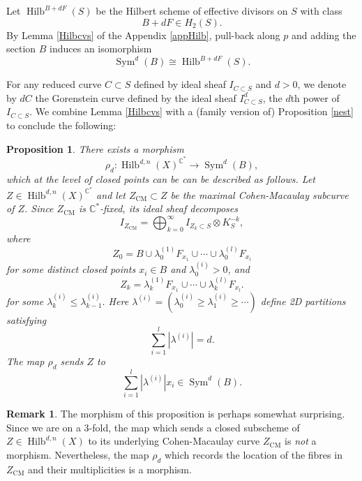 \documentclass{amsart}
\newtheorem{proposition}[theorem]{Proposition}
\theoremstyle{definition}
\newtheorem{remark}[theorem]{Remark}
\newcommand{\CC} {\mathbb{C}}          %
\newcommand{\Sym}{\operatorname{Sym}}
\newcommand{\Hilb}{\operatorname{Hilb}}
\newcommand{\CM}{\operatorname{CM}}
\begin{document}
Let $\Hilb^{B+dF}(S)$ be the Hilbert scheme of effective divisors on $S$ with class $$B+dF \in H_2(S).$$ By Lemma \ref{Hilbcvs} of the Appendix \ref{appHilb}, pull-back along $p$ and adding the section $B$ induces an isomorphism
$$
\Sym^d(B) \cong \Hilb^{B+dF}(S).
$$

For any reduced curve $C \subset S$ defined by ideal sheaf $I_{C \subset S}$ and $d >0$, we denote by $dC$ the Gorenstein curve defined by the ideal sheaf $I_{C \subset S}^d$, the $d$th power of $I_{C \subset S}$. We combine Lemma \ref{Hilbcvs} with a (family version of) Proposition \ref{nest} to conclude the following:
\begin{proposition} \label{proprho}
There exists a morphism
$$
\rho_d : \Hilb^{d,n}(X)^{\CC^*} \longrightarrow \Sym^d(B), 
$$
which at the level of closed points can be can be described as follows. Let $Z \in \Hilb^{d,n}(X)^{\CC^*}$ and let $Z_{\CM} \subset Z$ be the maximal Cohen-Macaulay subcurve of $Z$. Since $Z_{\CM}$ is $\CC^*$-fixed, its ideal sheaf decomposes
$$
I_{Z_{\CM}} = \bigoplus_{k=0}^{\infty} I_{Z_k \subset S} \otimes K_{S}^{-k},
$$
where 
$$
Z_0 = B \cup \lambda_{0}^{(1)} F_{x_1} \cup \cdots \cup \lambda_{0}^{(l)} F_{x_l}
$$
for some distinct closed points $x_i \in B$ and $\lambda_{0}^{(i)} > 0$, and
$$
Z_k = \lambda_{k}^{(1)} F_{x_1} \cup \cdots \cup \lambda_{k}^{(l)} F_{x_l}.
$$
for some $\lambda_{k}^{(i)} \leq \lambda_{k-1}^{(i)}$. Here $\lambda^{(i)} = (\lambda^{(i)}_{0} \geq \lambda^{(i)}_{1} \geq \cdots)$ define 2D partitions satisfying 
$$
\sum_{i=1}^{l} |\lambda^{(i)}| = d.
$$
The map $\rho_d$ sends $Z$ to 
$$
\sum_{i=1}^{l} |\lambda^{(i)}| x_i \in \Sym^d(B).
$$
\end{proposition}

\begin{remark}
The morphism of this proposition is perhaps somewhat surprising. Since we are on a 3-fold, the map which sends a closed subscheme of $Z \in \Hilb^{d,n}(X)$ to its underlying Cohen-Macaulay curve $Z_{\CM}$ is \emph{not} a morphism. Nevertheless, the map $\rho_d$ which records the location of the fibres in $Z_{\CM}$ and their multiplicities is a morphism.
\end{remark}
\end{document}
